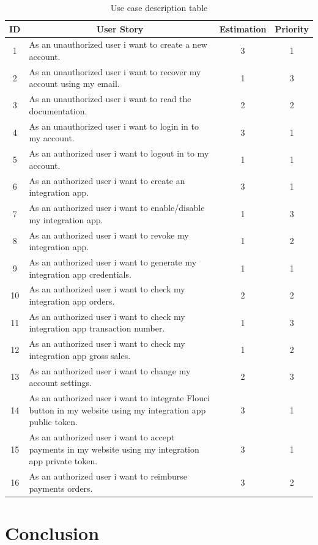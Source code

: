 \begin{spacing}{1.2}
\begin{table}[!h]
\centering
\caption{Use case description table}
\begin{tabularx}{\linewidth}{|c|X|c|c|}
\hline
ID & \multicolumn{1}{c|}{User Story} & Estimation & Priority \\ \hline
1 & As an unauthorized user i want to create a new account. &  3 & 1  \\  \hline
2 & As an unauthorized user i want to recover my account using my email. &  1 & 3 \\ \hline
3 & As an unauthorized user i want to read the documentation. & 2 & 2 \\ \hline
4 & As an unauthorized user i want to login in to my account. & 3 & 1 \\ \hline
5 & As an authorized user i want to logout in to my account. & 1 & 1 \\ \hline
6 & As an authorized user i want to create an integration app. & 3 & 1 \\ \hline
7 & As an authorized user i want to  enable/disable my integration app. & 1 & 3 \\ \hline
8 & As an authorized user i want to  revoke my integration app. & 1 & 2 \\ \hline
9 & As an authorized user i want to  generate my integration app credentials. & 1 & 1 \\ \hline
10 & As an authorized user i want to check my integration app orders. & 2 & 2 \\ \hline
11 & As an authorized user i want to check my integration app transaction number. & 1 & 3 \\ \hline
12 & As an authorized user i want to check my integration app gross sales. & 1 & 2 \\ \hline
13 & As an authorized user i want to change my account settings. & 2 & 3 \\ \hline
14 & As an authorized user i want to integrate Flouci button in my website using my integration app public token. & 3 & 1 \\ \hline
15 & As an authorized user i want to accept payments in my website using my integration app private token. & 3 & 1 \\ \hline
16 & As an authorized user i want to reimburse payments orders. & 3 & 2 \\ \hline
\end{tabularx}
\end{table}

\section*{Conclusion}


\end{spacing}
